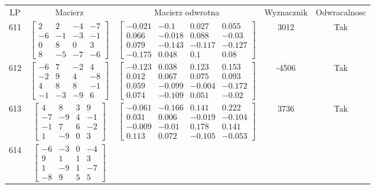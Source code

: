 \documentclass[a4paper,12pt]{article}
\begin{document}
\bgroup {} \vspace{0.2in} \begin{tabular}{c c c c c}
LP & Macierz & Macierz odwrotna & Wyznacznik & Odwracalnosc\\
611
&
$\begin{bmatrix} 2 & 2 & -4 & -7 \\ -6 & -1 & -3 & -1 \\ 0 & 8 & 0 & 3 \\ 8 & -5 & -7 & -6 \end{bmatrix}$
&
$\begin{bmatrix} -0.021 & -0.1 & 0.027 & 0.055 \\ 0.066 & -0.018 & 0.088 & -0.03 \\ 0.079 & -0.143 & -0.117 & -0.127 \\ -0.175 & 0.048 & 0.1 & 0.08 \end{bmatrix}$
&
3012
&
Tak
\\
612
&
$\begin{bmatrix} -6 & 7 & -2 & 4 \\ -2 & 9 & 4 & -8 \\ 4 & 8 & 8 & -1 \\ -1 & -3 & -9 & 6 \end{bmatrix}$
&
$\begin{bmatrix} -0.123 & 0.038 & 0.123 & 0.153 \\ 0.012 & 0.067 & 0.075 & 0.093 \\ 0.059 & -0.099 & -0.004 & -0.172 \\ 0.074 & -0.109 & 0.051 & -0.02 \end{bmatrix}$
&
-4506
&
Tak
\\
613
&
$\begin{bmatrix} 4 & 8 & 3 & 9 \\ -7 & -9 & 4 & -1 \\ -1 & 7 & 6 & -2 \\ 1 & -9 & 0 & 3 \end{bmatrix}$
&
$\begin{bmatrix} -0.061 & -0.166 & 0.141 & 0.222 \\ 0.031 & 0.006 & -0.019 & -0.104 \\ -0.009 & -0.01 & 0.178 & 0.141 \\ 0.113 & 0.072 & -0.105 & -0.053 \end{bmatrix}$
&
3736
&
Tak
\\
614
&
$\begin{bmatrix} -6 & -3 & 0 & -4 \\ 9 & 1 & 1 & 3 \\ 1 & -9 & 1 & -7 \\ -8 & 9 & 5 & 5 \end{bmatrix}$

\end{tabular}
\end{document}
